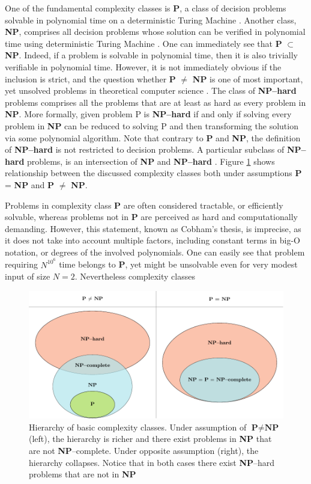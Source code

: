 One of the fundamental complexity classes is \textbf{P}, a class of decision problems solvable in polynomial time on a deterministic Turing Machine  \cite{arora}. Another class, \textbf{NP}, comprises all decision problems whose solution can be verified in polynomial time using deterministic Turing Machine \cite{arora}.
One can immediately see that \textbf{P} $\subset$ \textbf{NP}. Indeed, if a problem is solvable in polynomial time, then it is also trivially verifiable in polynomial time. However, it is not immediately obvious if the inclusion is strict, and the question whether \textbf{P} $\ne$ \textbf{NP} is one of most important, yet unsolved problems in theoretical computer science \cite{fortnow}.
The class of \textbf{NP--hard} problems comprises all the problems that are at least as hard as every problem in \textbf{NP}. More formally, given problem P is \textbf{NP--hard} if and only if solving every problem in \textbf{NP} can be reduced to solving P and then transforming the solution via some polynomial algorithm. Note that contrary to \textbf{P} and \textbf{NP},  the definition of \textbf{NP--hard} is not restricted to decision problems. A particular subclass of \textbf{NP--hard} problems, is an intersection of \textbf{NP} and \textbf{NP--hard} \cite{arora}. Figure \ref{fig:complexity} shows relationship between the discussed complexity classes both under assumptions \textbf{P} = \textbf{NP} and \textbf{P} $\ne$ \textbf{NP}.

Problems in complexity class \textbf{P} are often considered tractable, or efficiently solvable, whereas problems not in \textbf{P} are perceived as hard and computationally demanding. However, this statement, known as Cobham's thesis, is imprecise, as it does not take into account multiple factors, including constant terms in big-O notation, or degrees of the involved polynomials. One can easily see that problem requiring $N^{10^6}$ time belongs to \textbf{P}, yet might be unsolvable even for very modest input of size $N=2$. Nevertheless complexity classes

\begin{figure}
    \includegraphics[width=\textwidth]{figures/complexity_new.pdf}
    \caption{Hierarchy of basic complexity classes. Under assumption of $\textbf{P} \ne \textbf{NP}$ (left), the hierarchy is richer and there exist problems in \textbf{NP}  that are not \textbf{NP}--complete. Under opposite assumption (right), the hierarchy collapses. Notice that in both cases there exist \textbf{NP}--hard problems that are not in \textbf{NP}
    }
    \label{fig:complexity}
\end{figure}


